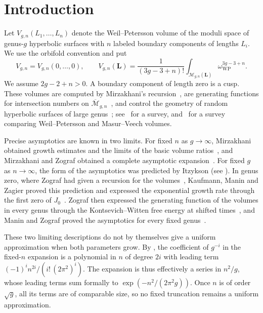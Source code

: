 \section{Introduction}

Let $V_{g,n}(L_1,\ldots,L_n)$ denote the Weil--Petersson volume of the moduli space of genus-$g$ hyperbolic surfaces with $n$ labeled boundary components of lengths $L_i$. We use the orbifold convention and put
\[
 V_{g,n}=V_{g,n}(0,\ldots,0),\qquad
 V_{g,n}(\mathbf L)=\frac{1}{(3g-3+n)!}
 \int_{\mathcal M_{g,n}(\mathbf L)}\omega_{\mathrm{WP}}^{3g-3+n}.
\]
We assume $2g-2+n>0$. A boundary component of length zero is a cusp. These volumes are computed by Mirzakhani's recursion~\cite{MirInv}, are generating functions for intersection numbers on $\overline{\mathcal M}_{g,n}$~\cite{MirJAMS}, and control the geometry of random hyperbolic surfaces of large genus~\cite{Mir}; see~\cite{Wright} for a survey, and~\cite{ChenMullane} for a survey comparing Weil--Petersson and Masur--Veech volumes.

Precise asymptotics are known in two limits. For fixed $n$ as $g\to\infty$, Mirzakhani obtained growth estimates and the limits of the basic volume ratios~\cite{Mir}, and Mirzakhani and Zograf obtained a complete asymptotic expansion~\cite{MZ}. For fixed $g$ as $n\to\infty$, the form of the asymptotics was predicted by Itzykson (see \cite[Remark~3]{Zog98}). In genus zero, where Zograf had given a recursion for the volumes~\cite{Zog93}, Kaufmann, Manin and Zagier proved this prediction and expressed the exponential growth rate through the first zero of $J_0$~\cite{KMZ}. Zograf then expressed the generating function of the volumes in every genus through the Kontsevich--Witten free energy at shifted times~\cite{Zog98}, and Manin and Zograf proved the asymptotics for every fixed genus~\cite[Theorem~6.1]{ManZ}.

These two limiting descriptions do not by themselves give a uniform approximation when both parameters grow. By \cite[Theorem~1.2]{MZ}, the coefficient of $g^{-i}$ in the fixed-$n$ expansion is a polynomial in $n$ of degree $2i$ with leading term $(-1)^in^{2i}/(i!\,(2\pi^2)^i)$. The expansion is thus effectively a series in $n^2/g$, whose leading terms sum formally to $\exp(-n^2/(2\pi^2g))$. Once $n$ is of order $\sqrt g$, all its terms are of comparable size, so no fixed truncation remains a uniform approximation.


